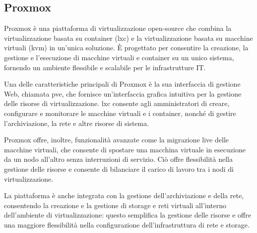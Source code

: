 \subsection{Proxmox}

Proxmox è una piattaforma di virtualizzazione open-source che combina la virtualizzazione basata su container (\acrshort{lxc}) e la virtualizzazione basata su macchine virtuali (\acrfull{kvm}) in un'unica soluzione. È progettato per consentire la creazione, la gestione e l'esecuzione di macchine virtuali e container su un unico sistema, fornendo un ambiente flessibile e scalabile per le infrastrutture IT.

Una delle caratteristiche principali di Proxmox è la sua interfaccia di gestione Web, chiamata \acrfull{pve}, che fornisce un'interfaccia grafica intuitiva per la gestione delle risorse di virtualizzazione. \acrshort{lxc} consente agli amministratori di creare, configurare e monitorare le macchine virtuali e i container, nonché di gestire l'archiviazione, la rete e altre risorse di sistema.

Proxmox offre, inoltre, funzionalità avanzate come la migrazione live delle macchine virtuali, che consente di spostare una macchina virtuale in esecuzione da un nodo all'altro senza interruzioni di servizio. Ciò offre flessibilità nella gestione delle risorse e consente di bilanciare il carico di lavoro tra i nodi di virtualizzazione.

La piattaforma è anche integrata con la gestione dell'archiviazione e della rete, consentendo la creazione e la gestione di storage e reti virtuali all'interno dell'ambiente di virtualizzazione: questo semplifica la gestione delle risorse e offre una maggiore flessibilità nella configurazione dell'infrastruttura di rete e storage.
